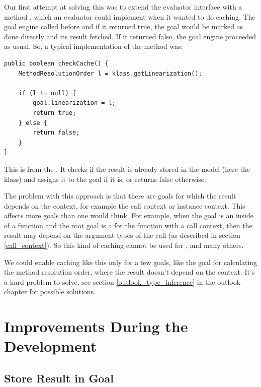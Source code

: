 \documentclass[12pt,halfparskip,DIV11,BCOR10mm]{scrreprt}
\begin{document}
Our first attempt at solving this was to extend the evaluator interface with a method , which an evaluator could implement when it wanted to do caching. The goal engine called  before  and if it returned true, the goal would be marked as done directly and its result fetched. If it returned false, the goal engine proceeded as usual. So, a typical implementation of the  method was:

\begin{lstlisting}[style=java]
public boolean checkCache() {
    MethodResolutionOrder l = klass.getLinearization();
		
    if (l != null) {
        goal.linearization = l;
        return true;
    } else {
        return false;
    }
}
\end{lstlisting}

This is from the . It checks if the result is already stored in the model (here the klass) and assigns it to the goal if it is, or returns false otherwise.

The problem with this approach is that there are goals for which the result depends on the context, for example the call context or instance context. This affects more goals than one would think. For example, when the goal is an  inside of a function and the root goal is a  for the function with a call context, then the result may depend on the argument types of the call (as described in section \vref{call_context}). So this kind of caching cannot be used for ,  and many others.

We could enable caching like this only for a few goals, like the goal for calculating the method resolution order, where the result doesn't depend on the context. It's a hard problem to solve, see section \vref{outlook_type_inference} in the outlook chapter for possible solutions.

\section{Improvements During the Development}


\subsection{Store Result in Goal}
\end{document}
